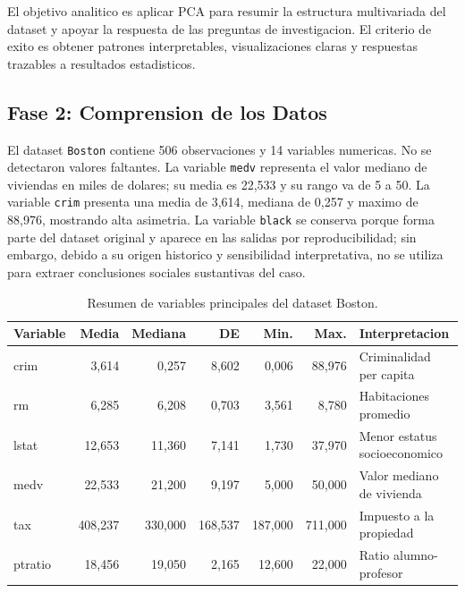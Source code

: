 \documentclass[10pt,a4paper]{article}
\begin{document}
El objetivo analitico es aplicar PCA para resumir la estructura multivariada del dataset y apoyar la respuesta de las preguntas de investigacion. El criterio de exito es obtener patrones interpretables, visualizaciones claras y respuestas trazables a resultados estadisticos.

\subsection{Fase 2: Comprension de los Datos}

El dataset \texttt{Boston} contiene 506 observaciones y 14 variables numericas. No se detectaron valores faltantes. La variable \texttt{medv} representa el valor mediano de viviendas en miles de dolares; su media es 22,533 y su rango va de 5 a 50. La variable \texttt{crim} presenta una media de 3,614, mediana de 0,257 y maximo de 88,976, mostrando alta asimetria. La variable \texttt{black} se conserva porque forma parte del dataset original y aparece en las salidas por reproducibilidad; sin embargo, debido a su origen historico y sensibilidad interpretativa, no se utiliza para extraer conclusiones sociales sustantivas del caso.

\begin{table}[H]
  \centering
  \caption{Resumen de variables principales del dataset Boston.}
  \label{tab:resumen_variables}
  \footnotesize
  \begin{tabularx}{\textwidth}{l r r r r r X}
    \toprule
    \textbf{Variable} & \textbf{Media} & \textbf{Mediana} & \textbf{DE} & \textbf{Min.} & \textbf{Max.} & \textbf{Interpretacion} \\
    \midrule
    crim & 3,614 & 0,257 & 8,602 & 0,006 & 88,976 & Criminalidad per capita \\
    rm & 6,285 & 6,208 & 0,703 & 3,561 & 8,780 & Habitaciones promedio \\
    lstat & 12,653 & 11,360 & 7,141 & 1,730 & 37,970 & Menor estatus socioeconomico \\
    medv & 22,533 & 21,200 & 9,197 & 5,000 & 50,000 & Valor mediano de vivienda \\
    tax & 408,237 & 330,000 & 168,537 & 187,000 & 711,000 & Impuesto a la propiedad \\
    ptratio & 18,456 & 19,050 & 2,165 & 12,600 & 22,000 & Ratio alumno-profesor \\
    \bottomrule
  \end{tabularx}
\end{table}
\end{document}
